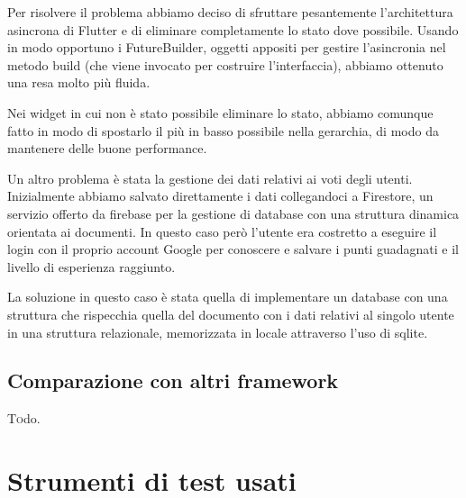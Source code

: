 Per risolvere il problema abbiamo deciso di sfruttare pesantemente l'architettura asincrona di Flutter e di eliminare completamente lo stato dove possibile.
Usando in modo opportuno i FutureBuilder, oggetti appositi per gestire l'asincronia nel metodo build (che viene invocato per costruire l'interfaccia), abbiamo ottenuto una resa molto più fluida.

Nei widget in cui non è stato possibile eliminare lo stato, abbiamo comunque fatto in modo di spostarlo il più in basso possibile nella gerarchia, di modo da mantenere delle buone performance.

Un altro problema è stata la gestione dei dati relativi ai voti degli utenti.
Inizialmente abbiamo salvato direttamente i dati collegandoci a Firestore, un servizio offerto da firebase per la gestione di database con una struttura dinamica orientata ai documenti.
In questo caso però l'utente era costretto a eseguire il login con il proprio account Google per conoscere e salvare i punti guadagnati e il livello di esperienza raggiunto.

La soluzione in questo caso è stata quella di implementare un database con una struttura che rispecchia quella del documento con i dati relativi al singolo utente in una struttura relazionale, memorizzata in locale attraverso l'uso di sqlite.

\subsection{Comparazione con altri framework\label{sec:flutter-comparazione}}
\lettrine[findent=1.5em]{T}odo.

\section{Strumenti di test usati}
